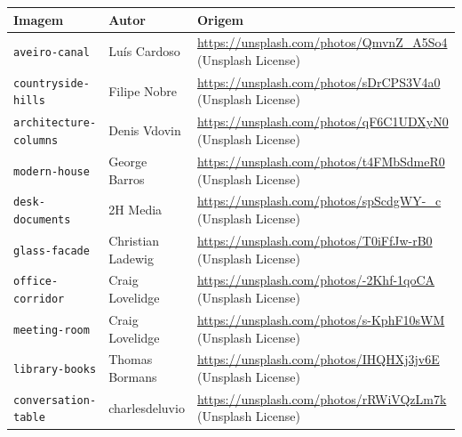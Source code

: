 \begin{longtable}{p{4cm}p{4cm}p{6.8cm}}
\toprule
\textbf{Imagem} & \textbf{Autor} & \textbf{Origem} \\
\midrule
\endhead
\texttt{aveiro-canal} & Luís Cardoso & \url{https://unsplash.com/photos/QmvnZ_A5So4} (Unsplash License) \\
\texttt{countryside-hills} & Filipe Nobre & \url{https://unsplash.com/photos/sDrCPS3V4a0} (Unsplash License) \\
\texttt{architecture-columns} & Denis Vdovin & \url{https://unsplash.com/photos/qF6C1UDXyN0} (Unsplash License) \\
\texttt{modern-house} & George Barros & \url{https://unsplash.com/photos/t4FMbSdmeR0} (Unsplash License) \\
\texttt{desk-documents} & 2H Media & \url{https://unsplash.com/photos/spScdgWY-_c} (Unsplash License) \\
\texttt{glass-facade} & Christian Ladewig & \url{https://unsplash.com/photos/T0iFfJw-rB0} (Unsplash License) \\
\texttt{office-corridor} & Craig Lovelidge & \url{https://unsplash.com/photos/-2Khf-1qoCA} (Unsplash License) \\
\texttt{meeting-room} & Craig Lovelidge & \url{https://unsplash.com/photos/s-KphF10sWM} (Unsplash License) \\
\texttt{library-books} & Thomas Bormans & \url{https://unsplash.com/photos/IHQHXj3jv6E} (Unsplash License) \\
\texttt{conversation-table} & charlesdeluvio & \url{https://unsplash.com/photos/rRWiVQzLm7k} (Unsplash License) \\
\bottomrule
\end{longtable}
